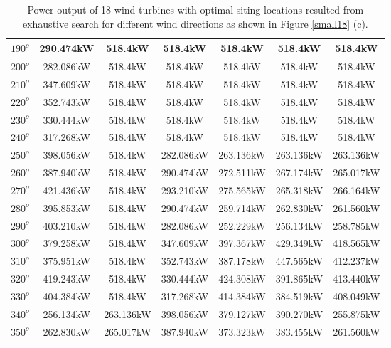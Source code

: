 \begin{table}[H]
\begin{tabular}{|c|c|c|c|c|c|c|}
		$190^o$	& 290.474kW	& 518.4kW	& 518.4kW	& 518.4kW	& 518.4kW	& 518.4kW	\\ \hline
		$200^o$	& 282.086kW	& 518.4kW	& 518.4kW	& 518.4kW	& 518.4kW	& 518.4kW	\\ \hline
		$210^o$	& 347.609kW	& 518.4kW	& 518.4kW	& 518.4kW	& 518.4kW	& 518.4kW	\\ \hline
		$220^o$	& 352.743kW	& 518.4kW	& 518.4kW	& 518.4kW	& 518.4kW	& 518.4kW	\\ \hline
		$230^o$	& 330.444kW	& 518.4kW	& 518.4kW	& 518.4kW	& 518.4kW	& 518.4kW	\\ \hline
		$240^o$	& 317.268kW	& 518.4kW	& 518.4kW	& 518.4kW	& 518.4kW	& 518.4kW	\\ \hline
		$250^o$	& 398.056kW	& 518.4kW	& 282.086kW	& 263.136kW	& 263.136kW	& 263.136kW	\\ \hline
		$260^o$	& 387.940kW	& 518.4kW	& 290.474kW	& 272.511kW	& 267.174kW	& 265.017kW	\\ \hline
		$270^o$	& 421.436kW	& 518.4kW	& 293.210kW	& 275.565kW	& 265.318kW	& 266.164kW	\\ \hline
		$280^o$	& 395.853kW	& 518.4kW	& 290.474kW	& 259.714kW	& 262.830kW	& 261.560kW	\\ \hline
		$290^o$	& 403.210kW	& 518.4kW	& 282.086kW	& 252.229kW	& 256.134kW	& 258.785kW	\\ \hline
		$300^o$	& 379.258kW	& 518.4kW	& 347.609kW	& 397.367kW	& 429.349kW	& 418.565kW	\\ \hline
		$310^o$	& 375.951kW	& 518.4kW	& 352.743kW	& 387.178kW	& 447.565kW	& 412.237kW	\\ \hline
		$320^o$	& 419.243kW	& 518.4kW	& 330.444kW	& 424.308kW	& 391.865kW	& 413.440kW	\\ \hline
		$330^o$	& 404.384kW	& 518.4kW	& 317.268kW	& 414.384kW	& 384.519kW	& 408.049kW	\\ \hline
		$340^o$	& 256.134kW	& 263.136kW	& 398.056kW	& 379.127kW	& 390.270kW	& 255.875kW	\\ \hline
		$350^o$	& 262.830kW	& 265.017kW	& 387.940kW	& 373.323kW	& 383.455kW	& 261.560kW	\\ \hline
        	\end{tabular}
        	\caption{Power output of 18 wind turbines with optimal siting locations resulted from exhaustive search for different wind directions as shown in Figure \ref{small18} (c).}
        	\label{table18c}
        \end{table}
        \doublespacing
        
